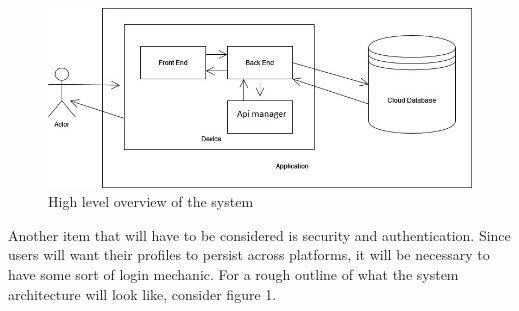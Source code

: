 \begin{figure}[h!]
    \centering
    \includegraphics[width=1\textwidth]{images/system_diagram.jpg}
    \caption{High level overview of the system}
\end{figure}

Another item that will have to be considered is security and authentication.  Since users will want their profiles to persist across platforms, it will be necessary to have some sort of login mechanic.  
For a rough outline of what the system architecture will look like, consider figure 1.


